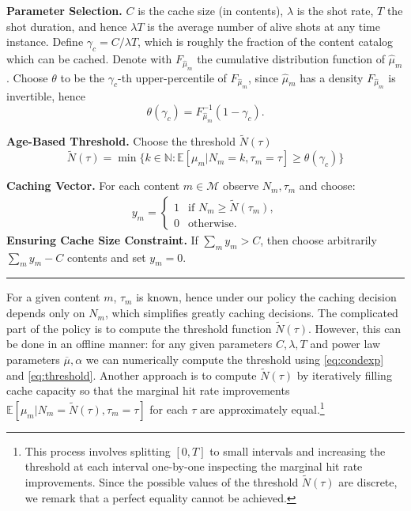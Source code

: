 \documentclass[10pt, conference, letterpaper]{IEEEtran}
\newcommand{\spyros}[1]{{#1}}
\newcommand{\mean}[1]{\mathbb{E}\!\left[#1\right]}
\def\N{\mathbb{N}}
\begin{document}
\noindent\textbf{Parameter Selection.} 
$C$ is the cache size (in contents), $\lambda$ is the shot rate, $T$ the shot duration, and hence $\lambda T$ is the average number of alive shots at any time instance.
Define $\gamma_c=C/\lambda T$, which is roughly the fraction of the content catalog which can be cached.
Denote with $F_{\widehat \mu_m}$ the \spyros {cumulative distribution function} of  $\widehat \mu_m$. 
Choose $\theta$ to be the $\gamma_c$-th upper-percentile of $F_{\widehat \mu_m}$, since $\widehat \mu_m$ has a density $F_{\widehat \mu_m}$ is invertible, hence
\[
\theta(\gamma_c)=F_{\widehat \mu_m}^{-1}(1-\gamma_c).
\]



\noindent\textbf{Age-Based Threshold.}
Choose the threshold $\tilde N(\tau)$ 
\begin{equation}\label{eq:threshold}
\widetilde N(\tau)=\min\{k\in \N : \mean{\mu_m|N_m=k,\tau_m=\tau}\geq \theta(\gamma_c)\}
\end{equation}



\noindent\textbf{Caching Vector.}
  For each content $m\in \mathcal{M}$ observe $N_m,\tau_m$ and choose: 
	\vspace{-0.1in}
\begin{align*}
y_m=\left\{\begin{array}{ll}
1 & \text{if } N_m\geq \widetilde N(\tau_m),\\
0 & \text{otherwise.}
\end{array}
\right.
\end{align*}
\noindent\textbf{Ensuring Cache Size Constraint.} If $\sum_m y_m>C$, then choose arbitrarily $\sum_m y_m-C$ contents and set $y_m=0$.

\noindent\rule{3.55in}{0.02in}

For a given content $m$, $\tau_m$ is known, hence under our policy the caching decision depends only on $N_m$, which simplifies greatly caching decisions. The  complicated part of the policy is to compute the threshold function $\widetilde N(\tau)$. However, this can be done in an offline manner: for any given parameters $C,\lambda,T$ and power law parameters $\overline{\mu},\alpha$ we can numerically compute the threshold using \eqref{eq:condexp} and \eqref{eq:threshold}. Another approach is to compute $\widetilde N(\tau)$  by iteratively filling cache capacity so that the marginal hit rate improvements $\mean{\mu_m\big|N_m=\widetilde N(\tau),\tau_m=\tau}$ for each $\tau$ are approximately equal.\footnote{
This process involves splitting $[0,T]$ to small intervals and increasing the threshold at each interval one-by-one inspecting the marginal hit rate improvements.
Since the possible values of the threshold $\widetilde N(\tau)$ are discrete, we remark that a perfect equality cannot be achieved.}
\end{document}
